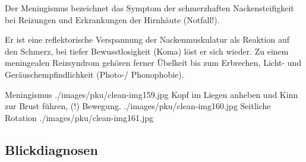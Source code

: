 {Der Meningismus bezeichnet das Symptom der schmerzhaften
Nackensteifigkeit bei Reizungen und Erkrankungen der
Hirnhäute (Notfall!).

Er ist eine reflektorische Verspannung der Nackenmuskulatur
als Reaktion auf den Schmerz, bei tiefer Bewusstlosigkeit
(Koma) löst er sich wieder. Zu einem meningealen Reizsyndrom
gehören ferner Übelkeit bis zum Erbrechen, Licht- und
Geräuschempfindlichkeit (Photo-/ Phonophobie).


}{}{}{}{}

\begin{PictureSeriesWide}{}{Meningismus}
{./images/pku/clean-img159.jpg}
{Kopf im Liegen anheben und Kinn zur Brust führen,
 (!) Bewegung. }
{./images/pku/clean-img160.jpg}
{Seitliche Rotation}
{./images/pku/clean-img161.jpg}
{}
{}
{}
\end{PictureSeriesWide}





\cleardoublepage
\subsection{Blickdiagnosen}

